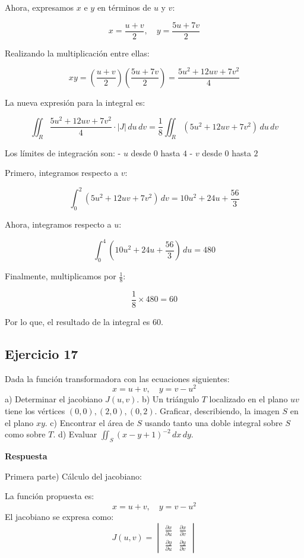 \documentclass{report}
\begin{document}
Ahora, expresamos \(x\) e \(y\) en términos de \(u\) y \(v\):

\[
x = \frac{u + v}{2}, \quad y = \frac{5u + 7v}{2}
\]

Realizando la multiplicación entre ellas:

\[
xy = \left(\frac{u + v}{2}\right) \left(\frac{5u + 7v}{2}\right) = \frac{5u^2 + 12uv + 7v^2}{4}
\]

La nueva expresión para la integral es:

\[
\iint_{R} \frac{5u^2 + 12uv + 7v^2}{4} \cdot |J| \, du \, dv = \frac{1}{8} \iint_{R} (5u^2 + 12uv + 7v^2) \, du \, dv
\]

Los límites de integración son:
- \(u\) desde \(0\) hasta \(4\)
- \(v\) desde \(0\) hasta \(2\)

Primero, integramos respecto a \(v\):

\[
\int_{0}^{2} (5u^2 + 12uv + 7v^2) \, dv = 10u^2 + 24u + \frac{56}{3}
\]

Ahora, integramos respecto a \(u\):

\[
\int_{0}^{4} \left(10u^2 + 24u + \frac{56}{3}\right) \, du = 480
\]

Finalmente, multiplicamos por \(\frac{1}{8}\):

\[
\frac{1}{8} \times 480 = 60
\]

Por lo que, el resultado de la integral es \(\boxed{60}\).\subsection{Ejercicio 17}

Dada la función transformadora con las ecuaciones siguientes:
$$
x = u + v, \quad y = v - u^2
$$
a) Determinar el jacobiano $J(u, v)$.
b) Un triángulo $T$ localizado en el plano $uv$ tiene los vértices $(0,0), (2,0), (0,2)$. Graficar, describiendo, la imagen $S$ en el plano $xy$.
c) Encontrar el área de $S$ usando tanto una doble integral sobre $S$ como sobre $T$.
d) Evaluar $\iint_{S} (x-y+1)^{-2} \, dx \, dy$.

\textbf{Respuesta}

Primera parte) Cálculo del jacobiano:

La función propuesta es:
$$
x = u + v, \quad y = v - u^2
$$
El jacobiano se expresa como:
$$
J(u, v) = \begin{vmatrix} 
\frac{\partial x}{\partial u} & \frac{\partial x}{\partial v} \\ 
\frac{\partial y}{\partial u} & \frac{\partial y}{\partial v} 
\end{vmatrix}
$$
\end{document}
